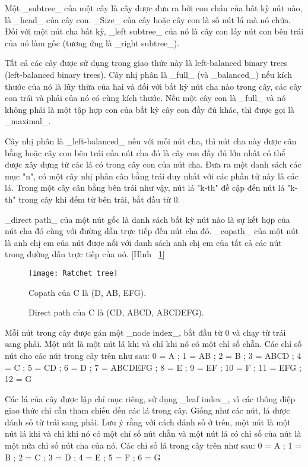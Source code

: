 \documentclass[../main-report.tex]{subfiles}
\begin{document}
Một \_subtree\_ của một cây là cây được đưa ra bởi con cháu của bất kỳ nút nào, là \_head\_ của cây con. \_Size\_ của cây hoặc cây con là số nút lá mà nó chứa. Đối với một nút cha bất kỳ, \_left subtree\_ của nó là cây con lấy nút con bên trái của nó làm gốc (tương ứng là \_right subtree\_).

Tất cả các cây được sử dụng trong giao thức này là \glsdesc{left-balanced binary trees} (\gls{left-balanced binary trees}). Cây nhị phân là \_full\_ (và \_balanced\_) nếu kích thước của nó là lũy thừa của hai và đối với bất kỳ nút cha nào trong cây, các cây con trái và phải của nó có cùng kích thước. Nếu một cây con là \_full\_  và nó không phải là một tập hợp con của bất kỳ cây con đầy đủ khác, thì được gọi là \_maximal\_. 

Cây nhị phân là \_left-balanced\_ nếu với mỗi nút cha, thì nút cha này được cân bằng hoặc cây con bên trái của nút cha đó là cây con đầy đủ lớn nhất có thể được xây dựng từ các lá có trong cây con của nút cha. Đưa ra một danh sách các mục "n", có một cây nhị phân cân bằng trái duy nhất với các phần tử này là các lá. Trong một cây cân bằng bên trái như vậy, nút lá "k-th" đề cập đến nút lá "k-th" trong cây khi đếm từ bên trái, bắt đầu từ 0.

\_direct path\_ của một nút gốc là danh sách bất kỳ nút nào là sự kết hợp của nút cha đó cùng với đường dẫn trực tiếp đến nút cha đó. \_copath\_ của một nút là anh chị em của nút được nối với danh sách anh chị em của tất cả các nút trong đường dẫn trực tiếp của nó. [Hình ~\ref{fig:Ratchet-tree}]

\begin{figure}[!h]
\begin{center}
\label{fig:Ratchet-tree}
\texttt{[image: Ratchet tree]}
\caption{Direct path của C là (CD, ABCD, ABCDEFG).}

{Copath của C là (D, AB, EFG).}
\end{center}
\end{figure}

Mỗi nút trong cây được gán một \_node index\_, bắt đầu từ 0 và chạy từ trái sang phải. Một nút là một nút lá khi và chỉ khi nó có một chỉ số chẵn. Các chỉ số nút cho các nút trong cây trên như sau:
0 = A ; 1 = AB ; 2 = B ; 3 = ABCD ; 4 = C ; 5 = CD ; 6 = D ; 7 = ABCDEFG ; 8 = E ; 9 = EF ; 10 = F ; 11 = EFG ; 12 = G

Các lá của cây được lập chỉ mục riêng, sử dụng \_leaf index\_, vì các thông điệp giao thức chỉ cần tham chiếu đến các lá trong cây. Giống như các nút, lá được đánh số từ trái sang phải. Lưu ý rằng với cách đánh số ở trên, một nút là một nút lá khi và chỉ khi nó có một chỉ số nút chẵn và một nút lá có chỉ số của nút là một nửa chỉ số nút cha của nó. Các chỉ số lá trong cây trên như sau:
0 = A ; 1 = B ; 2 = C ; 3 = D ; 4 = E ; 5 = F ; 6 = G
\end{document}
